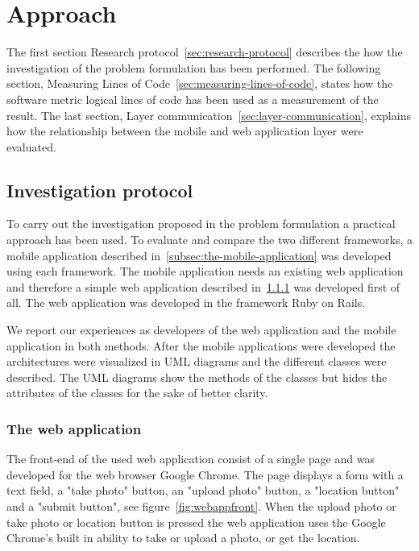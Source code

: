 \chapter{Approach} \label{ch:approach}
The first section Research protocol~\ref{sec:research-protocol} describes the how the investigation of the problem formulation has been performed. The following section, Measuring Lines of Code~\ref{sec:measuring-lines-of-code}, states how the software metric logical lines of code has been used as a measurement of the result. The last section, Layer communication~\ref{sec:layer-communication}, explains how the relationship between the mobile and web application layer were evaluated. 


\section{Investigation protocol} \label{sec:investigation-protocol}
To carry out the investigation proposed in the problem formulation a practical approach has been used. To evaluate and compare the two different frameworks, a mobile application described in~\ref{subsec:the-mobile-application} was developed using each framework. The mobile application needs an existing web application and therefore a simple web application described in~\ref{subsec:the-web-application} was developed first of all. The web application was developed in the framework Ruby on Rails.

We report our experiences as developers of the web application and the mobile application in both methods. After the mobile applications were developed the architectures were visualized in UML diagrams and the different classes were described. The UML diagrams show the methods of the classes but hides the attributes of the classes for the sake of better clarity. 

\subsection{The web application} \label{subsec:the-web-application}
The front-end of the used web application consist of a single page and was developed for the web browser Google Chrome. The page displays a form with a text field, a "take photo" button, an "upload photo" button, a "location button" and a "submit button", see figure~\ref{fig:webappfront}. When the upload photo or take photo or location button is pressed the web application uses the Google Chrome’s built in ability to take or upload a photo,	 or get the location.

